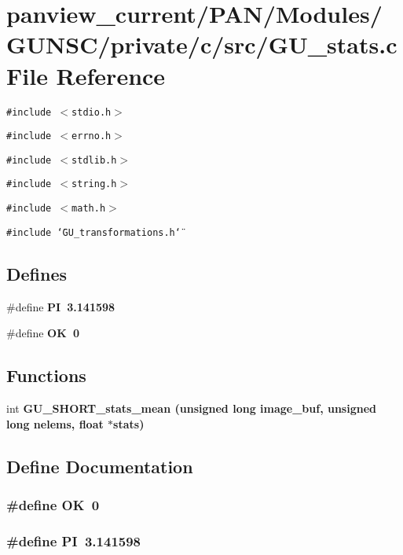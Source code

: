 \section{panview\_\-current/PAN/Modules/GUNSC/private/c/src/GU\_\-stats.c File Reference}
\label{GU__stats_8c}
{\tt \#include $<$stdio.h$>$}\par
{\tt \#include $<$errno.h$>$}\par
{\tt \#include $<$stdlib.h$>$}\par
{\tt \#include $<$string.h$>$}\par
{\tt \#include $<$math.h$>$}\par
{\tt \#include \char`\"{}GU\_\-transformations.h\char`\"{}}\par
\subsection*{Defines}
\begin{CompactItemize}
\item 
\#define \bf{PI}~3.141598
\item 
\#define \bf{OK}~0
\end{CompactItemize}
\subsection*{Functions}
\begin{CompactItemize}
\item 
int \bf{GU\_\-SHORT\_\-stats\_\-mean} (unsigned long image\_\-buf, unsigned long nelems, float $\ast$stats)
\end{CompactItemize}


\subsection{Define Documentation}
\subsubsection{\setlength{\rightskip}{0pt plus 5cm}\#define OK~0}\label{GU__stats_8c_ba51915c87d64af47fb1cc59348961c9}


\subsubsection{\setlength{\rightskip}{0pt plus 5cm}\#define PI~3.141598}\label{GU__stats_8c_598a3330b3c21701223ee0ca14316eca}




